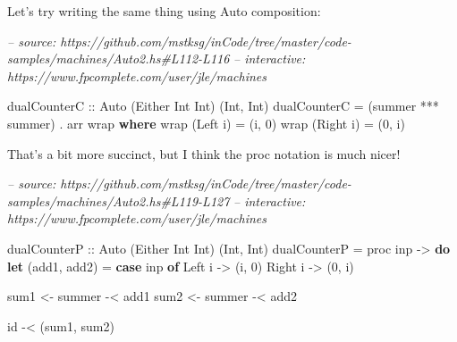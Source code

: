 \documentclass[]{article}
\newenvironment{Shaded}{}{}
\newcommand{\CommentTok}[1]{\textcolor[rgb]{0.38,0.63,0.69}{\textit{#1}}}
\newcommand{\DataTypeTok}[1]{\textcolor[rgb]{0.56,0.13,0.00}{#1}}
\newcommand{\DecValTok}[1]{\textcolor[rgb]{0.25,0.63,0.44}{#1}}
\newcommand{\FunctionTok}[1]{\textcolor[rgb]{0.02,0.16,0.49}{#1}}
\newcommand{\KeywordTok}[1]{\textcolor[rgb]{0.00,0.44,0.13}{\textbf{#1}}}
\newcommand{\NormalTok}[1]{#1}
\newcommand{\OtherTok}[1]{\textcolor[rgb]{0.00,0.44,0.13}{#1}}
\begin{document}
Let's try writing the same thing using Auto composition:

\begin{Shaded}
\begin{Highlighting}[]
\CommentTok{-- source: https://github.com/mstksg/inCode/tree/master/code-samples/machines/Auto2.hs#L112-L116}
\CommentTok{-- interactive: https://www.fpcomplete.com/user/jle/machines}

\OtherTok{dualCounterC ::} \DataTypeTok{Auto}\NormalTok{ (}\DataTypeTok{Either} \DataTypeTok{Int} \DataTypeTok{Int}\NormalTok{) (}\DataTypeTok{Int}\NormalTok{, }\DataTypeTok{Int}\NormalTok{)}
\NormalTok{dualCounterC }\FunctionTok{=}\NormalTok{ (summer }\FunctionTok{***}\NormalTok{ summer) }\FunctionTok{.}\NormalTok{ arr wrap}
  \KeywordTok{where}
\NormalTok{    wrap (}\DataTypeTok{Left}\NormalTok{ i)  }\FunctionTok{=}\NormalTok{ (i, }\DecValTok{0}\NormalTok{)}
\NormalTok{    wrap (}\DataTypeTok{Right}\NormalTok{ i) }\FunctionTok{=}\NormalTok{ (}\DecValTok{0}\NormalTok{, i)}
\end{Highlighting}
\end{Shaded}

That's a bit more succinct, but I think the proc notation is much nicer!

\begin{Shaded}
\begin{Highlighting}[]
\CommentTok{-- source: https://github.com/mstksg/inCode/tree/master/code-samples/machines/Auto2.hs#L119-L127}
\CommentTok{-- interactive: https://www.fpcomplete.com/user/jle/machines}

\OtherTok{dualCounterP ::} \DataTypeTok{Auto}\NormalTok{ (}\DataTypeTok{Either} \DataTypeTok{Int} \DataTypeTok{Int}\NormalTok{) (}\DataTypeTok{Int}\NormalTok{, }\DataTypeTok{Int}\NormalTok{)}
\NormalTok{dualCounterP }\FunctionTok{=}\NormalTok{ proc inp }\OtherTok{->} \KeywordTok{do}
    \KeywordTok{let}\NormalTok{ (add1, add2) }\FunctionTok{=} \KeywordTok{case}\NormalTok{ inp }\KeywordTok{of} \DataTypeTok{Left}\NormalTok{ i  }\OtherTok{->}\NormalTok{ (i, }\DecValTok{0}\NormalTok{)}
                                   \DataTypeTok{Right}\NormalTok{ i }\OtherTok{->}\NormalTok{ (}\DecValTok{0}\NormalTok{, i)}

\NormalTok{    sum1 }\OtherTok{<-}\NormalTok{ summer }\FunctionTok{-<}\NormalTok{ add1}
\NormalTok{    sum2 }\OtherTok{<-}\NormalTok{ summer }\FunctionTok{-<}\NormalTok{ add2}

\NormalTok{    id }\FunctionTok{-<}\NormalTok{ (sum1, sum2)}
\end{Highlighting}
\end{Shaded}
\end{document}
